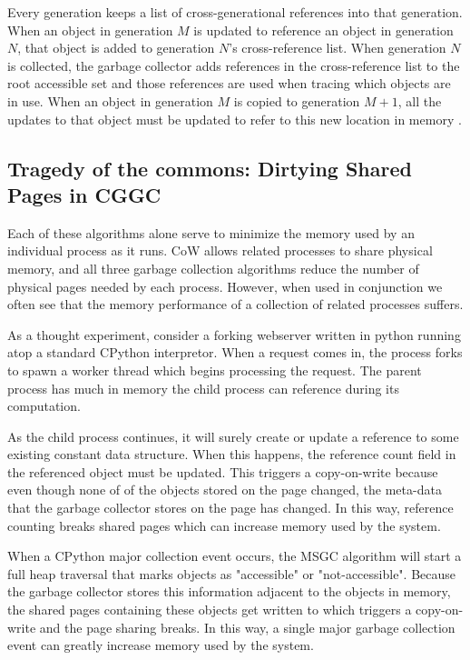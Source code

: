 \documentclass{article}
\begin{document}
  Every generation keeps a list of cross-generational references into that generation.  When an object in generation $M$ is updated to reference an object in generation $N$, that object is added to generation $N$'s cross-reference list.  When generation $N$ is collected, the garbage collector adds references in the cross-reference list to the root accessible set and those references are used when tracing which objects are in use.  When an object in generation $M$ is copied to generation $M + 1$, all the updates to that object must be updated to refer to this new location in memory \cite{GC-continuum}.  

  \subsection{Tragedy of the commons: Dirtying Shared Pages in CGGC}\label{sec:CoWGC}

  Each of these algorithms alone serve to minimize the memory used by an individual process as it runs.  CoW allows related processes to share physical memory, and all three garbage collection algorithms reduce the number of physical pages needed by each process.  However, when used in conjunction we often see that the memory performance of a collection of related processes suffers.

  As a thought experiment, consider a forking webserver written in python running atop a standard CPython interpretor.  When a request comes in, the process forks to spawn a worker thread which begins processing the request.  The parent process has much in memory the child process can reference during its computation.  

  As the child process continues, it will surely create or update a reference to some existing constant data structure.  When this happens, the reference count field in the referenced object must be updated.  This triggers a copy-on-write because even though none of of the objects stored on the page changed, the meta-data that the garbage collector stores on the page has changed.  In this way, reference counting breaks shared pages which can increase memory used by the system.

  When a CPython major collection event occurs, the MSGC algorithm will start a full heap traversal that marks objects as "accessible" or "not-accessible".  Because the garbage collector stores this information adjacent to the objects in memory, the shared pages containing these objects get written to which triggers a copy-on-write and the page sharing breaks.  In this way, a single major garbage collection event can greatly increase memory used by the system.
\end{document}
